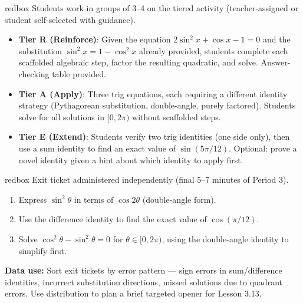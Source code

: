 \documentclass[10pt]{article}
\begin{document}
\vspace{0.08in}

\begin{skillbox}{redbox}
Students work in groups of 3--4 on the tiered activity (teacher-assigned
or student self-selected with guidance).

\begin{itemize}[leftmargin=1.4em, itemsep=4pt]
  \item \textbf{Tier R (Reinforce)}: Given the equation $2\sin^2x + \cos x - 1 = 0$
    and the substitution $\sin^2x = 1 - \cos^2x$ already provided, students complete
    each scaffolded algebraic step, factor the resulting quadratic, and solve.
    Answer-checking table provided.
  \item \textbf{Tier A (Apply)}: Three trig equations, each requiring a different
    identity strategy (Pythagorean substitution, double-angle, purely factored).
    Students solve for all solutions in $[0, 2\pi)$ without scaffolded steps.
  \item \textbf{Tier E (Extend)}: Students verify two trig identities (one side only),
    then use a sum identity to find an exact value of $\sin(5\pi/12)$.
    Optional: prove a novel identity given a hint about which identity to apply first.
\end{itemize}
\end{skillbox}

\vspace{0.08in}

\begin{skillbox}{redbox}
Exit ticket administered independently (final 5--7 minutes of Period 3).

\begin{enumerate}[leftmargin=1.4em, itemsep=4pt]
  \item Express $\sin^2\theta$ in terms of $\cos 2\theta$ (double-angle form).
  \item Use the difference identity to find the exact value of $\cos(\pi/12)$.
  \item Solve $\cos^2\theta - \sin^2\theta = 0$ for $\theta \in [0, 2\pi)$,
    using the double-angle identity to simplify first.
\end{enumerate}

\textbf{Data use:} Sort exit tickets by error pattern --- sign errors in sum/difference
identities, incorrect substitution directions, missed solutions due to quadrant errors.
Use distribution to plan a brief targeted opener for Lesson 3.13.
\end{skillbox}
\end{document}
